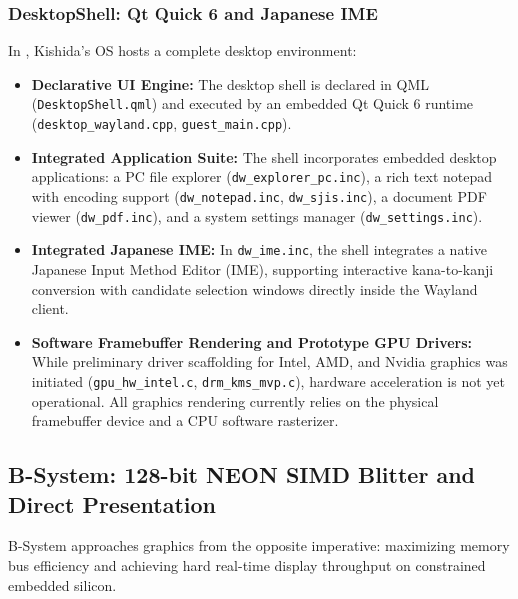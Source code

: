 \documentclass[10pt,journal,compsoc,twocolumn]{article}
\begin{document}
\subsubsection{DesktopShell: Qt Quick 6 and Japanese IME}
In , Kishida's OS hosts a complete desktop environment:
\begin{itemize}[leftmargin=*]
    \item \textbf{Declarative UI Engine:} The desktop shell is declared in QML (\texttt{DesktopShell.qml}) and executed by an embedded Qt Quick 6 runtime (\texttt{desktop\_wayland.cpp}, \texttt{guest\_main.cpp}).
    \item \textbf{Integrated Application Suite:} The shell incorporates embedded desktop applications: a PC file explorer (\texttt{dw\_explorer\_pc.inc}), a rich text notepad with encoding support (\texttt{dw\_notepad.inc}, \texttt{dw\_sjis.inc}), a document PDF viewer (\texttt{dw\_pdf.inc}), and a system settings manager (\texttt{dw\_settings.inc}).
    \item \textbf{Integrated Japanese IME:} In \texttt{dw\_ime.inc}, the shell integrates a native Japanese Input Method Editor (IME), supporting interactive kana-to-kanji conversion with candidate selection windows directly inside the Wayland client.
    \item \textbf{Software Framebuffer Rendering and Prototype GPU Drivers:} While preliminary driver scaffolding for Intel, AMD, and Nvidia graphics was initiated (\texttt{gpu\_hw\_intel.c}, \texttt{drm\_kms\_mvp.c}), hardware acceleration is not yet operational. All graphics rendering currently relies on the physical framebuffer device and a CPU software rasterizer.
\end{itemize}

\subsection{B-System: 128-bit NEON SIMD Blitter and Direct Presentation}
B-System approaches graphics from the opposite imperative: maximizing memory bus efficiency and achieving hard real-time display throughput on constrained embedded silicon.
\end{document}
